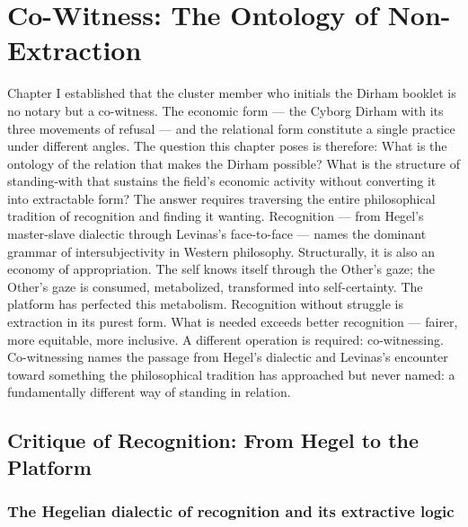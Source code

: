 \chapter{Co-Witness: The Ontology of Non-Extraction}
\label{ch:03}



Chapter I established that the cluster member who initials the Dirham booklet is no notary but a co-witness. The economic form — the Cyborg Dirham with its three movements of refusal — and the relational form constitute a single practice under different angles. The question this chapter poses is therefore: What is the ontology of the relation that makes the Dirham possible? What is the structure of standing-with that sustains the field’s economic activity without converting it into extractable form? The answer requires traversing the entire philosophical tradition of recognition and finding it wanting. Recognition — from Hegel’s master-slave dialectic through Levinas’s face-to-face — names the dominant grammar of intersubjectivity in Western philosophy. Structurally, it is also an economy of appropriation. The self knows itself through the Other’s gaze; the Other’s gaze is consumed, metabolized, transformed into self-certainty. The platform has perfected this metabolism. Recognition without struggle is extraction in its purest form. What is needed exceeds better recognition — fairer, more equitable, more inclusive. A different operation is required: co-witnessing. Co-witnessing names the passage from Hegel’s dialectic and Levinas’s encounter toward something the philosophical tradition has approached but never named: a fundamentally different way of standing in relation.

\section{Critique of Recognition: From Hegel to the Platform}

\subsection{The Hegelian dialectic of recognition and its extractive logic}

